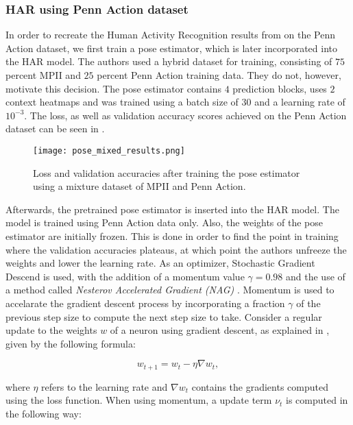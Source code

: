 \subsubsection{HAR using Penn Action dataset}
In order to recreate the Human Activity Recognition results from \cite{luvizon_2d/3d_2018} on the Penn Action dataset, we first train a pose estimator, which is later incorporated into the HAR model.
The authors used a hybrid dataset for training, consisting of $75$ percent MPII and $25$ percent Penn Action training data.
They do not, however, motivate this decision.
The pose estimator contains $4$ prediction blocks, uses $2$ context heatmaps and was trained using a batch size of $30$ and a learning rate of $10^{-3}$.
The loss, as well as validation accuracy scores achieved on the Penn Action dataset can be seen in .

\begin{figure}[htb!]
    \centering
    \texttt{[image: pose\_mixed\_results.png]}
    \caption{Loss and validation accuracies after training the pose estimator using a mixture dataset of MPII and Penn Action.}
    \label{fig:pose_mixed_results}
\end{figure}

Afterwards, the pretrained pose estimator is inserted into the HAR model.
The model is trained using Penn Action data only.
Also, the weights of the pose estimator are initially frozen.
This is done in order to find the point in training where the validation accuracies plateaus, at which point the authors unfreeze the weights and lower the learning rate.
As an optimizer, Stochastic Gradient Descend is used, with the addition of a momentum value $\gamma = 0.98$ and the use of a method called \textit{Nesterov Accelerated Gradient (NAG)} \cite{nesterov_method_1983}.
Momentum is used to accelarate the gradient descent process by incorporating a fraction $\gamma$ of the previous step size to compute the next step size to take.
Consider a regular update to the weights $w$ of a neuron using gradient descent, as explained in , given by the following formula:

\begin{equation}
    w_{t+1} = w_t - \eta \nabla w_t,
\end{equation}

where $\eta$ refers to the learning rate and $\nabla w_t$ contains the gradients computed using the loss function.
When using momentum, a update term $\nu_t$ is computed in the following way:

